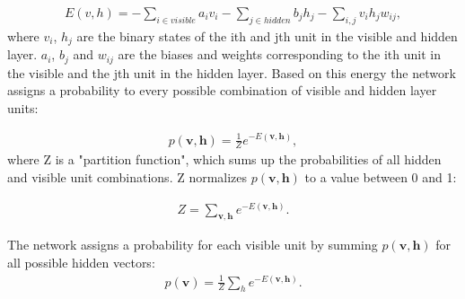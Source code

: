 \begin{equation}
\begin{aligned}
    E(v,h) = -\sum_{i \in visible} a_{i}v_{i}-\sum_{j \in hidden} b_{j}h_{j}-\sum_{i,j} v_{i}h_{j}w_{ij},
\end{aligned}
\end{equation}
where $v_{i}$, $h_{j}$ are the binary states of the ith and jth unit in the visible and hidden layer. $a_{i}$, $b_{j}$ and $w_{ij}$ are the biases and weights corresponding to the ith unit in the visible and the jth unit in the hidden layer. Based on this energy the network assigns a probability to every possible combination of visible and hidden layer units:

\begin{equation}
\begin{aligned}
    p(\mathbf{v,h}) = \frac{1}{Z} e^{-E(\mathbf{v,h})},
\end{aligned}
\end{equation}
where Z is a "partition function", which sums up the probabilities of all hidden and visible unit combinations. Z normalizes $p(\mathbf{v,h})$ to a value between 0 and 1:

\begin{equation}
\begin{aligned}
    Z = \sum_{\mathbf{v,h}}e^{-E(\mathbf{v,h})}.
\end{aligned}
\end{equation}

The network assigns a probability for each visible unit by summing $p(\mathbf{v,h})$ for all possible hidden vectors:
\begin{equation}
\begin{aligned}
    p(\mathbf{v}) = \frac{1}{Z} \sum_{h} e^{-E(\mathbf{v,h})}.
    \label{eq:prob_visible_layer}
\end{aligned}
\end{equation}


